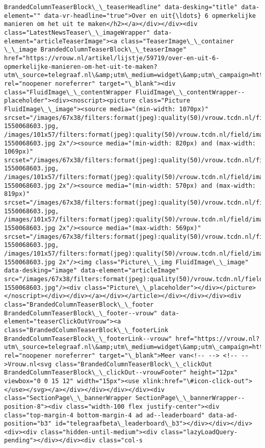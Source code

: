 \documentclass[11pt]{article}
\begin{document}
\begin{Verbatim}[commandchars=\\\{\}]
BrandedColumnTeaserBlock\_\_teaserHeadline" data-desking="title" data-element="" data-vr-headline="true">Over en uit{\ldots} 6 opmerkelijke manieren om het uit te maken</h2></a></div></div><div class="LatestNewsTeaser\_\_imageWrapper" data-element="articleTeaserImage"><a class="TeaserImage\_\_container \_\_image BrandedColumnTeaserBlock\_\_teaserImage" href="https://vrouw.nl/artikel/lijstje/59719/over-en-uit-6-opmerkelijke-manieren-om-het-uit-te-maken?utm\_source=telegraaf.nl\&amp;utm\_medium=widget\&amp;utm\_campaign=https://www.telegraaf.nl/" rel="noopener noreferrer" target="\_blank"><div class="FluidImage\_\_contentWrapper FluidImage\_\_contentWrapper--placeholder"><div><noscript><picture class="Picture FluidImage\_\_image"><source media="(min-width: 1070px)" srcset="/images/67x38/filters:format(jpeg):quality(50)/vrouw.tcdn.nl/field/image/5354b09b62362e797438579002b20598-1550068603.jpg, /images/101x57/filters:format(jpeg):quality(50)/vrouw.tcdn.nl/field/image/5354b09b62362e797438579002b20598-1550068603.jpg 2x"/><source media="(min-width: 820px) and (max-width: 1069px)" srcset="/images/67x38/filters:format(jpeg):quality(50)/vrouw.tcdn.nl/field/image/5354b09b62362e797438579002b20598-1550068603.jpg, /images/101x57/filters:format(jpeg):quality(50)/vrouw.tcdn.nl/field/image/5354b09b62362e797438579002b20598-1550068603.jpg 2x"/><source media="(min-width: 570px) and (max-width: 819px)" srcset="/images/67x38/filters:format(jpeg):quality(50)/vrouw.tcdn.nl/field/image/5354b09b62362e797438579002b20598-1550068603.jpg, /images/101x57/filters:format(jpeg):quality(50)/vrouw.tcdn.nl/field/image/5354b09b62362e797438579002b20598-1550068603.jpg 2x"/><source media="(max-width: 569px)" srcset="/images/67x38/filters:format(jpeg):quality(50)/vrouw.tcdn.nl/field/image/5354b09b62362e797438579002b20598-1550068603.jpg, /images/101x57/filters:format(jpeg):quality(50)/vrouw.tcdn.nl/field/image/5354b09b62362e797438579002b20598-1550068603.jpg 2x"/><img class="Picture\_\_img FluidImage\_\_image" data-desking="image" data-element="articleImage" src="/images/67x38/filters:format(jpeg):quality(50)/vrouw.tcdn.nl/field/image/5354b09b62362e797438579002b20598-1550068603.jpg"/><div class="Picture\_\_placeholder"></div></picture></noscript></div></div></a></div></article></div></div></div><div class="BrandedColumnTeaserBlock\_\_footer BrandedColumnTeaserBlock\_\_footer--vrouw" data-element="teaserClickOutVrouw"><a class="BrandedColumnTeaserBlock\_\_footerLink BrandedColumnTeaserBlock\_\_footerLink--vrouw" href="https://vrouw.nl?utm\_source=telegraaf.nl\&amp;utm\_medium=widget\&amp;utm\_campaign=https://www.telegraaf.nl/" rel="noopener noreferrer" target="\_blank">Meer van<!-- --> <!-- -->Vrouw.nl<svg class="BrandedColumnTeaserBlock\_\_clickOut BrandedColumnTeaserBlock\_\_clickOut--vrouwFooter" height="12px" viewbox="0 0 15 12" width="15px"><use xlink:href="\#icon-click-out"></use></svg></a></div></div></div></div><div class="SectionPage\_\_bannerWrapper SectionPage\_\_bannerWrapper--position-8"><div class="width-100 flex justify-center"><div class="top-margin-4 bottom-margin-4 ad ad--leaderboard" data-ad-position="b3" id="telegraafbeta\_leaderboard\_b3"></div></div></div><div><div class="hidden-until-medium"><div class="lazyLoadQuery-pending"></div></div><div class="col-s 
\end{Verbatim}
\end{document}
